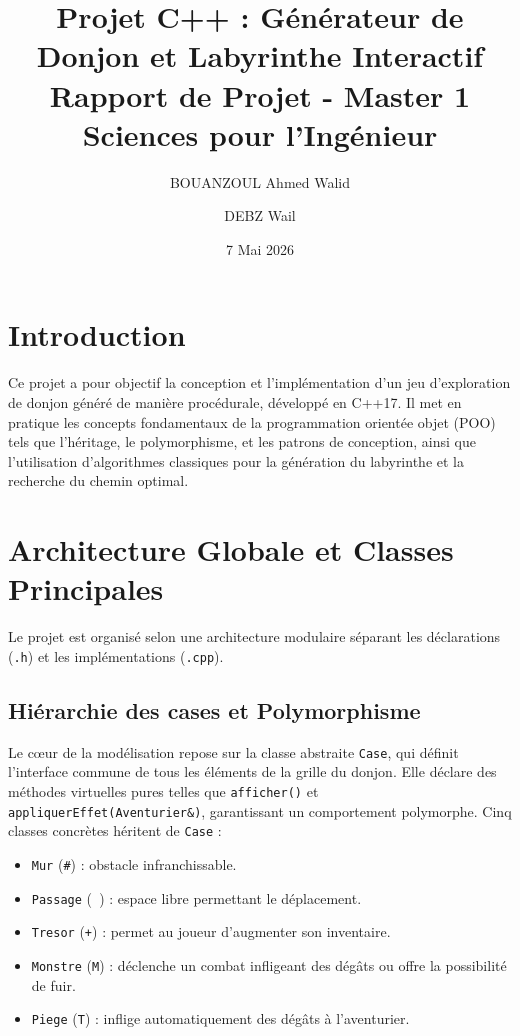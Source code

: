 \documentclass[11pt,a4paper]{article}
\title{\textbf{Projet C++ : Générateur de Donjon et Labyrinthe Interactif} \\ \large Rapport de Projet - Master 1 Sciences pour l'Ingénieur}
\author{BOUANZOUL Ahmed Walid \and DEBZ Wail}
\date{7 Mai 2026}
\begin{document}
\maketitle

\section{Introduction}
Ce projet a pour objectif la conception et l'implémentation d'un jeu d'exploration de donjon généré de manière procédurale, développé en C++17. Il met en pratique les concepts fondamentaux de la programmation orientée objet (POO) tels que l'héritage, le polymorphisme, et les patrons de conception, ainsi que l'utilisation d'algorithmes classiques pour la génération du labyrinthe et la recherche du chemin optimal.

\section{Architecture Globale et Classes Principales}
Le projet est organisé selon une architecture modulaire séparant les déclarations (\texttt{.h}) et les implémentations (\texttt{.cpp}).

\subsection{Hiérarchie des cases et Polymorphisme}
Le cœur de la modélisation repose sur la classe abstraite \texttt{Case}, qui définit l'interface commune de tous les éléments de la grille du donjon. Elle déclare des méthodes virtuelles pures telles que \texttt{afficher()} et \texttt{appliquerEffet(Aventurier\&)}, garantissant un comportement polymorphe.
Cinq classes concrètes héritent de \texttt{Case} :
\begin{itemize}
    \item \texttt{Mur} (\texttt{\#}) : obstacle infranchissable.
    \item \texttt{Passage} (\texttt{ }) : espace libre permettant le déplacement.
    \item \texttt{Tresor} (\texttt{+}) : permet au joueur d'augmenter son inventaire.
    \item \texttt{Monstre} (\texttt{M}) : déclenche un combat infligeant des dégâts ou offre la possibilité de fuir.
    \item \texttt{Piege} (\texttt{T}) : inflige automatiquement des dégâts à l'aventurier.
\end{itemize}
\end{document}
